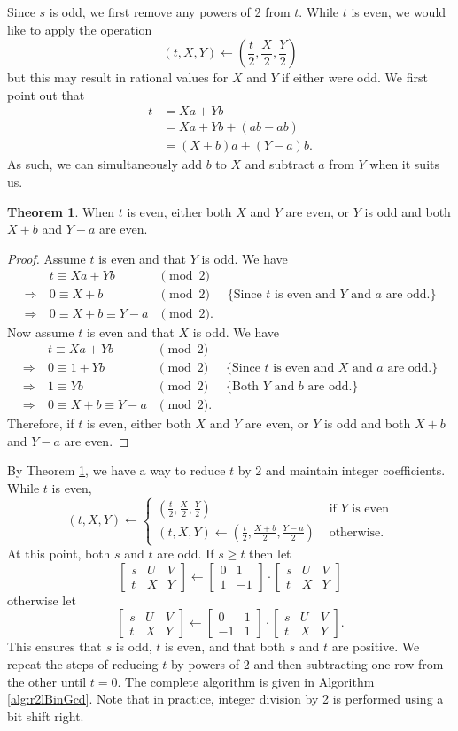 \documentclass{ucalgthes1}
\theoremstyle{definition}
\newtheorem{thm}{Theorem}[section]
\newcommand{\matrixtt}[4]{\left[ \begin{array}{rr} #1 & #2 \\ #3 & #4 \end{array} \right]}
\newcommand{\matrixThreeTwo}[6]{\left[ \begin{array}{rrr} #1 & #2 & #3 \\ #4 & #5 & #6 \end{array} \right]}
\begin{document}
Since $s$ is odd, we first remove any powers of 2 from $t$.  While $t$ is even, we would like to apply the operation
\[
(t, X, Y) \gets \left( \frac{t}{2}, \frac{X}{2}, \frac{Y}{2} \right)
\]
but this may result in rational values for $X$ and $Y$ if either were odd. We first point out that
\begin{align*}
	t &= Xa + Yb \\
	  &= Xa + Yb + (ab - ab) \\
	  &= (X+b)a + (Y-a)b.
\end{align*}
As such, we can simultaneously add $b$ to $X$ and subtract $a$ from $Y$ when it suits us.

\begin{thm}
\label{thm:addBSubA}
When $t$ is even, either both $X$ and $Y$ are even, or $Y$ is odd and both $X+b$ and $Y-a$ are even.
\end{thm}

\begin{proof}
Assume $t$ is even and that $Y$ is odd.  We have
\[
\begin{array}{rllr}
	         & t \equiv Xa + Yb & \pmod 2 \\
\Rightarrow~ & 0 \equiv X + b & \pmod 2 & \textrm{ \{Since $t$ is even and $Y$ and $a$ are odd.\}} \\
\Rightarrow~ & 0 \equiv X + b \equiv Y - a & \pmod 2. 
\end{array}
\]
Now assume $t$ is even and that $X$ is odd.  We have
\[
\begin{array}{rllr}
	         & t \equiv Xa + Yb & \pmod 2 \\
\Rightarrow~ & 0 \equiv 1 + Yb & \pmod 2 & \textrm{ \{Since $t$ is even and $X$ and $a$ are odd.\}} \\
\Rightarrow~ & 1 \equiv Yb & \pmod 2 & \textrm{ \{Both $Y$ and $b$ are odd.\}} \\
\Rightarrow~ & 0 \equiv X + b \equiv Y - a & \pmod 2. 
\end{array}
\]
Therefore, if $t$ is even, either both $X$ and $Y$ are even, or $Y$ is odd and both $X+b$ and $Y-a$ are even.
\end{proof}

By Theorem \ref{thm:addBSubA}, we have a way to reduce $t$ by 2 and maintain integer coefficients.  While $t$ is even, 
\[
	(t, X, Y) \gets \begin{cases}
		\left( \frac{t}{2}, \frac{X}{2}, \frac{Y}{2} \right) &
			\textrm{ if $Y$ is even} \\
		(t, X, Y) \gets \left( \frac{t}{2}, \frac{X+b}{2}, \frac{Y-a}{2} \right) & 
			\textrm{ otherwise.}
	\end{cases}
\]
At this point, both $s$ and $t$ are odd.  If $s \ge t$ then let
\[
	\matrixThreeTwo{s}{U}{V}{t}{X}{Y} \gets \matrixtt{0}{1}{1}{-1} \cdot \matrixThreeTwo{s}{U}{V}{t}{X}{Y}
\]
otherwise let
\[
	\matrixThreeTwo{s}{U}{V}{t}{X}{Y} \gets \matrixtt{0}{1}{-1}{1} \cdot \matrixThreeTwo{s}{U}{V}{t}{X}{Y}.
\]
This ensures that $s$ is odd, $t$ is even, and that both $s$ and $t$ are positive.  We repeat the steps of reducing $t$ by powers of 2 and then subtracting one row from the other until $t=0$.  The complete algorithm is given in Algorithm \ref{alg:r2lBinGcd}.  Note that in practice, integer division by 2 is performed using a bit shift right.
\end{document}
